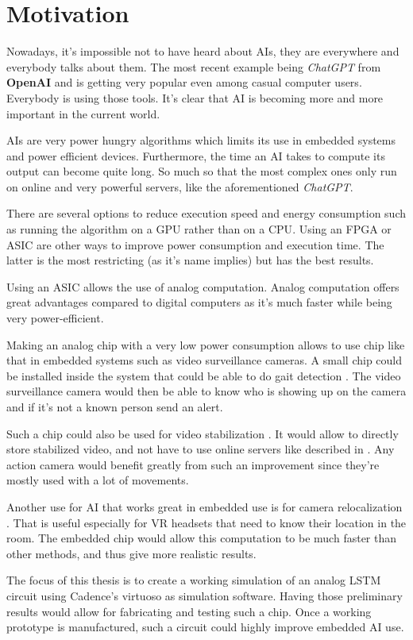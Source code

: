 \section{Motivation}
\label{sec:int_motivation}

Nowadays, it's impossible not to have heard about \acp{AI}, they are everywhere and everybody talks about them. The most recent example being \textit{ChatGPT} from \textbf{OpenAI} and is getting very popular even among casual computer users. Everybody is using those tools. It's clear that \ac{AI} is becoming more and more important in the current world.

\acp{AI} are very power hungry algorithms which limits its use in embedded systems and power efficient devices.
Furthermore, the time an \ac{AI} takes to compute its output can become quite long. So much so that the most complex ones only run on online and very powerful servers, like the aforementioned \textit{ChatGPT}.

There are several options to reduce execution speed and energy consumption such as running the algorithm on a \ac{GPU} rather than on a \ac{CPU}. Using an \ac{FPGA} or \ac{ASIC} are other ways to improve power consumption and execution time.
The latter is the most restricting (as it's name implies) but has the best results.

Using an \ac{ASIC} allows the use of analog computation. Analog computation offers great advantages compared to digital computers as it's much faster while being very power-efficient.

Making an analog chip with a very low power consumption allows to use chip like that in embedded systems such as video surveillance cameras. A small chip could be installed inside the system that could be able to do gait detection \cite{gaitDS,gaitDig,gait}. The video surveillance camera would then be able to know who is showing up on the camera and if it's not a known person send an alert.

Such a chip could also be used for video stabilization \cite{videoStab}. It would allow to directly store stabilized video, and not have to use online servers like described in \cite{videoStab}. Any action camera would benefit greatly from such an improvement since they're mostly used with a lot of movements.

Another use for \ac{AI} that works great in embedded use is for camera relocalization \cite{videoReloc}. That is useful especially for VR headsets that need to know their location in the room. The embedded chip would allow this computation to be much faster than other methods, and thus give more realistic results.

The focus of this thesis is to create a working simulation of an analog \ac{LSTM} circuit using Cadence's virtuoso as simulation software. Having those preliminary results would allow for fabricating and testing such a chip. Once a working prototype is manufactured, such a circuit could highly improve embedded \ac{AI} use.

